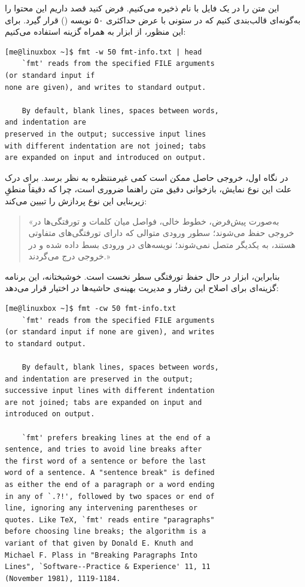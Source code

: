 این متن را در یک فایل با نام  ذخیره می‌کنیم. فرض کنید قصد داریم این محتوا را به‌گونه‌ای قالب‌بندی کنیم که در ستونی با عرض حداکثری ۵۰ نویسه () قرار گیرد. برای این منظور، از ابزار  به همراه گزینه  استفاده می‌کنیم:

\begin{latin}
\begin{lstlisting}
[me@linuxbox ~]$ fmt -w 50 fmt-info.txt | head
    `fmt' reads from the specified FILE arguments
(or standard input if
none are given), and writes to standard output.

    By default, blank lines, spaces between words,
and indentation are
preserved in the output; successive input lines
with different indentation are not joined; tabs
are expanded on input and introduced on output.
\end{lstlisting}
\end{latin}

در نگاه اول، خروجی حاصل ممکن است کمی غیرمنتظره به نظر برسد. برای درک علت این نوع نمایش، بازخوانی دقیق متن راهنما ضروری است، چرا که دقیقاً منطقِ زیربنایی این نوع پردازش را تبیین می‌کند:

\begin{quote}
«به‌صورت پیش‌فرض، خطوط خالی، فواصل میان کلمات و تورفتگی‌ها در خروجی حفظ می‌شوند؛ سطور ورودی متوالی که دارای تورفتگی‌های متفاوتی هستند، به یکدیگر متصل نمی‌شوند؛ نویسه‌های  در ورودی بسط داده شده و در خروجی درج می‌گردند.»
\end{quote}

بنابراین، ابزار  در حال حفظ تورفتگی سطر نخست است. خوشبختانه، این برنامه گزینه‌ای برای اصلاح این رفتار و مدیریت بهینه‌ی حاشیه‌ها در اختیار قرار می‌دهد:

\begin{latin}
\begin{lstlisting}
[me@linuxbox ~]$ fmt -cw 50 fmt-info.txt
    `fmt' reads from the specified FILE arguments
(or standard input if none are given), and writes
to standard output.

    By default, blank lines, spaces between words,
and indentation are preserved in the output;
successive input lines with different indentation
are not joined; tabs are expanded on input and
introduced on output.

    `fmt' prefers breaking lines at the end of a
sentence, and tries to avoid line breaks after
the first word of a sentence or before the last
word of a sentence. A "sentence break" is defined
as either the end of a paragraph or a word ending
in any of `.?!', followed by two spaces or end of
line, ignoring any intervening parentheses or
quotes. Like TeX, `fmt' reads entire "paragraphs"
before choosing line breaks; the algorithm is a
variant of that given by Donald E. Knuth and
Michael F. Plass in "Breaking Paragraphs Into
Lines", `Software--Practice & Experience' 11, 11
(November 1981), 1119-1184.
\end{lstlisting}
\end{latin}

